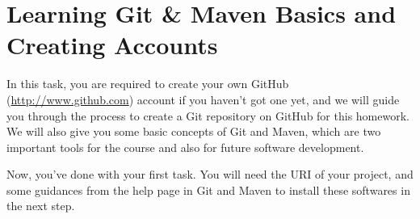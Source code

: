 
\chapter{Learning Git \& Maven Basics and Creating Accounts}

In this task, you are required to create your own GitHub (\url{http://www.github.com}) account if you haven't got one yet, and we will guide you through the process to create a Git repository on GitHub for this homework. We will also give you some basic concepts of Git and Maven, which are two important tools for the course and also for future software development.





Now, you've done with your first task. You will need the URI of your project, and some guidances from the help page in Git and Maven to install these softwares in the next step.